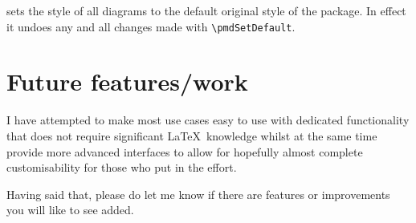 \documentclass{ltxdoc}
\begin{document}
\DescribeMacro{\pmdSetToOriginalDefault}
sets the style of all diagrams to the default original style of the package. In effect it undoes any and all changes made with \verb`\pmdSetDefault`.

\section{Future features/work}

I have attempted to make most use cases easy to use with dedicated functionality that does not require significant \LaTeX\ knowledge whilst at the same time provide more advanced interfaces to allow for hopefully almost complete customisability for those who put in the effort.

Having said that, please do let me know if there are features or improvements you will like to see added.
\end{document}
